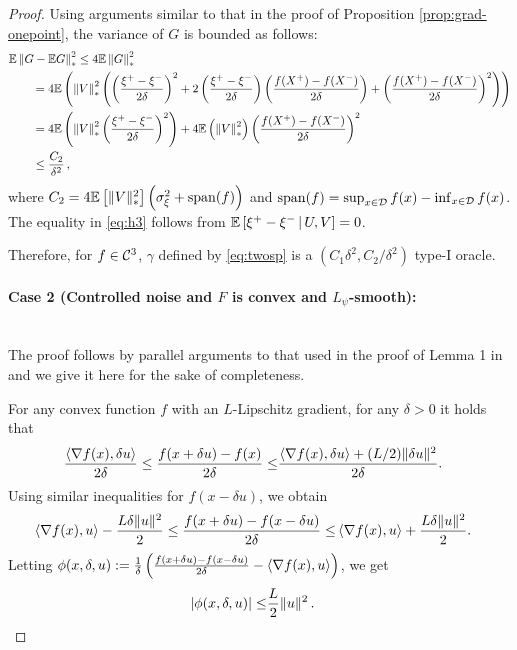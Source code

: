 \begin{proof}
Using arguments similar to that in the proof of Proposition \ref{prop:grad-onepoint}, the variance of $G$ is bounded as follows:
\begin{align}
\MoveEqLeft \E\left\| G - \E G\right\|_*^2
 \le 4 \E \left\|G\right\|_*^2 \nonumber \\
& =  4\E\left( \left\| V \right\|_*^2 \left(\left(\dfrac{\xi^+ - \xi^-}{2\delta}\right)^2  + 2 \left(\dfrac{\xi^+ - \xi^-}{2\delta}\right) \left(\dfrac{f(X^+) - f(X^-)}{2\delta}\right)
+ \left( \dfrac{f(X^+) - f(X^-)}{2\delta} \right)^2 \right)\right) \nonumber \\
&=  4\E\left( \left\| V \right\|_*^2 \left(\dfrac{\xi^+ - \xi^-}{2\delta}\right)^2\right)
+ 4 \E \left(\left\| V \right\|_*^2 \right)\left( \dfrac{f(X^+) - f(X^-)}{2\delta} \right)^2  \label{eq:h3} \\
& \le  \frac{C_2}{\delta^2}\,, \nonumber \label{eq:h4}
\end{align}
where $C_2 = 4 \mathbb{E}\left[\|V\|_*^2\right]\left( \sigma_\xi^2+\operatorname{span}(f)\right)$
and $\operatorname{span}(f) = \sup_{x\in \mathcal{D}} f(x) - \inf_{x\in \mathcal{D}} f(x)$.
The equality in \eqref{eq:h3} follows from $\mathbb{E}\left[ \xi^+-\xi^- \,|\, U,V \right] = 0$.

Therefore, for $f \in \mathcal{C}^3$, $\gamma$ defined by \eqref{eq:twosp} is a $(C_1\delta^2, C_2/\delta^2)$ type-I oracle.

\paragraph{Case 2 (Controlled noise and $F$ is convex and $L_{\psi}$-smooth):}\ \\
The proof follows by parallel arguments to that used in the proof of Lemma 1 in \cite{duchi2015optimal} and we give it here for the sake of completeness.

For any convex function $f$ with an $L$-Lipschitz gradient, for any $\delta>0$ it holds that
\begin{align*}
\frac{\left\langle\nabla f(x), \delta u\right\rangle}{2\delta} \le \frac{f(x + \delta u) -  f(x)}{2\delta} \le& \frac{\left\langle\nabla f(x), \delta u\right\rangle + (L / 2) \|\delta u\|^2}{2\delta}.
\end{align*}
Using similar inequalities for $f(x-\delta u)$, we obtain
\begin{align*}
\left\langle\nabla f(x), u\right\rangle - \frac{L \delta \| u\|^2}{2} \le \frac{f(x + \delta u) -  f(x-\delta u)}{2\delta} \le& \left\langle\nabla f(x), u\right\rangle + \frac{L \delta \| u\|^2}{2}.
\end{align*}
Letting
$\phi(x,\delta,u):=\frac1{\delta}\left(\frac{f(x + \delta u) -  f(x-\delta u)}{2\delta} - \left\langle\nabla f(x),  u\right\rangle\right)$, we get
\begin{align*}
\left|\phi(x,\delta,u) \right| \le&  \dfrac{L}{2} \|u\|^2\,.
\end{align*}


\end{proof}

